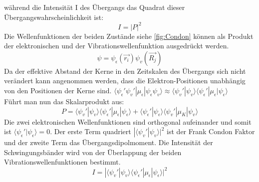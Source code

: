 während die Intensität I des Übergangs das Quadrat dieser Übergangswahrscheinlichkeit ist: 
\begin{equation}
    I = |P|^2
\end{equation}
Die Wellenfunktionen der beiden Zustände siehe \ref{fig:Condon} können als Produkt der elektronischen und der Vibrationswellenfunktion ausgedrückt werden.
\begin{equation}
    \psi = \psi_{\epsilon}(\vec{r_i}) \psi_v(\vec{R_j})
\end{equation} 
Da der effektive Abstand der Kerne in den Zeitskalen des Übergangs sich nicht verändert kann angenommen werden, dass die Elektron-Positionen unabhängig von den Positionen der Kerne sind.
$\langle \psi_{\epsilon}' \psi_v' | \mu_{\epsilon}| \psi_{\epsilon} \psi_v\rangle  \approx  \langle\psi_v' |\psi_v \rangle \langle\psi_{\epsilon}'|\mu_{\epsilon}| \psi_{\epsilon} \rangle $ \\
Führt man nun das Skalarprodukt aus:
\begin{equation}
    P = \langle \psi_v' | \psi_v \rangle \langle \psi_{\epsilon}' | \mu_{\epsilon} | \psi_{\epsilon} \rangle + \langle \psi_{\epsilon}' | \psi_{\epsilon} \rangle \langle\psi_v' | \mu_K |\psi_v \rangle
\end{equation}
Die zwei elektronischen Wellenfunktionen sind orthogonal aufeinander und somit ist $\langle \psi_{\epsilon}' | \psi_{\epsilon} \rangle  = 0$.
Der erste Term quadriert $|\langle \psi_v' | \psi_v \rangle|^2$ ist der Frank Condon Faktor und der zweite Term das Übergangsdipolmoment. 
Die Intensität der Schwingungsbänder wird von der Überlappung der beiden Vibrationswellenfunktionen bestimmt.
\begin{equation}
    I = |\langle \psi_v' | \psi_v \rangle \langle \psi_{\epsilon}' | \mu_{\epsilon} | \psi_{\epsilon} \rangle|^2
\end{equation}


\label{q:26}

